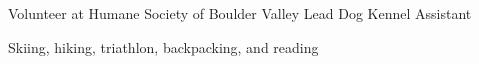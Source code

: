 

\begin{cvparagraph}
\vspace{3mm}
  \begin{cvitems} %
  \item {Volunteer at Humane Society of Boulder Valley \cpdot Lead Dog Kennel Assistant}
  \item {Skiing, hiking, triathlon, backpacking, and reading}
  \end{cvitems}
\end{cvparagraph}

